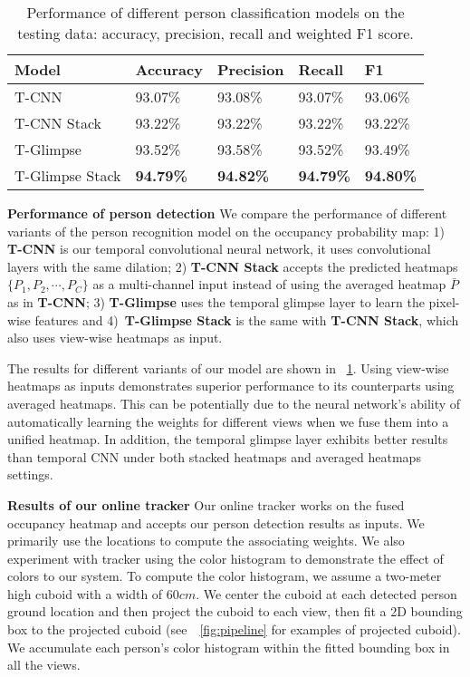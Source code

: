 \documentclass{article}
\begin{document}
\begin{table}[!htbp]
	\begin{center}
		\caption{Performance of different person classification models on the testing data: accuracy, precision, recall and weighted F1 score.}
		\label{tab:people:det}
		\begin{tabular}{l|l|l|l|l}
			\hline
			Model &	Accuracy	&	Precision	&	Recall	&	F1	\\  \hline
			T-CNN	&	93.07\%	&	93.08\%	&	93.07\%	&	93.06\%	\\
			T-CNN Stack	&	93.22\%	&	93.22\%	&	93.22\%	&	93.22\%	\\
			T-Glimpse	&	93.52\%	&	93.58\%	&	93.52\%	&	93.49\%	\\
			T-Glimpse Stack	&	\textbf{94.79\%}	&	\textbf{94.82\%}	&	\textbf{94.79\%}	&	\textbf{94.80\%}	\\
			\hline
		\end{tabular}
	\end{center}
\end{table}

\textbf{Performance of person detection}
We compare the performance of different variants of the person recognition model on the occupancy probability map: 1) \textbf{T-CNN} is our temporal
convolutional neural network, it uses convolutional layers with the same dilation; 2) \textbf{T-CNN Stack} accepts the predicted heatmaps $\{P_1, P_2, \cdots, P_C\}$ as a multi-channel input instead of using the
averaged heatmap $\bar{P}$ as in \textbf{T-CNN}; 3) \textbf{T-Glimpse} uses the temporal glimpse layer to learn the pixel-wise features and 4)~\textbf{T-Glimpse Stack} is the same with \textbf{T-CNN Stack}, which also
uses view-wise heatmaps as input.

The results for different variants of our model are shown in \tablename{~\ref{tab:people:det}}. Using view-wise heatmaps as inputs demonstrates superior performance to its counterparts using averaged
heatmaps. This can be potentially due to the neural network's ability of automatically learning the weights for different views when we fuse them into a unified heatmap.
In addition, the temporal glimpse layer exhibits better results than temporal CNN under both stacked heatmaps and averaged heatmaps settings.

\textbf{Results of our online tracker}
Our online tracker works on the fused occupancy heatmap and accepts our person detection results as inputs.
We primarily use the locations to compute the associating weights. We also experiment with tracker using the color histogram to
demonstrate the effect of colors to our system. To compute the color histogram, we assume a
two-meter high cuboid with a width of $60\mathit{cm}$. We center the cuboid at each detected person
ground location and then project the cuboid to each view, then fit a 2D bounding box to the projected cuboid (see~\figurename{~\ref{fig:pipeline}} for examples of projected cuboid).
We accumulate each person's color histogram within the fitted bounding box in all the views.
\end{document}
